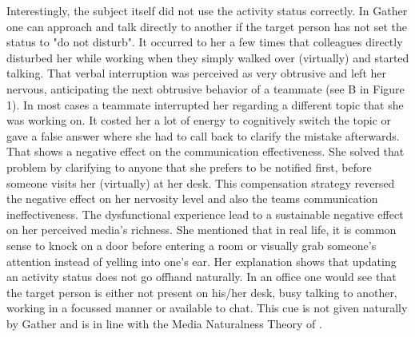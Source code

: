 \documentclass[man]{apa7}
\begin{document}
Interestingly, the subject itself did not use the activity status correctly. In Gather one can approach and talk directly to another if the target person has not set the status to "do not disturb". It occurred to her a few times that colleagues directly disturbed her while working when they simply walked over (virtually) and started talking. That verbal interruption was perceived as very obtrusive and left her nervous, anticipating the next obtrusive behavior of a teammate (see B in Figure 1). In most cases a teammate interrupted her regarding a different topic that she was working on. It costed her a lot of energy to cognitively switch the topic or gave a false answer where she had to call back to clarify the mistake afterwards. That shows a negative effect on the communication effectiveness. She solved that problem by clarifying to anyone that she prefers to be notified first, before someone visits her (virtually) at her desk. This compensation strategy reversed the negative effect on her nervosity level and also the teams communication ineffectiveness. The dysfunctional experience lead to a sustainable negative effect on her perceived media's richness. She mentioned that in real life, it is common sense to knock on a door before entering a room or visually grab someone's attention instead of yelling into one's ear. Her explanation shows that updating an activity status does not go offhand naturally. In an office one would see that the target person is either not present on his/her desk, busy talking to another, working in a focussed manner or available to chat. This cue is not given naturally by Gather and is in line with the Media Naturalness Theory of \citeauthor{Kock2005}.
\end{document}
